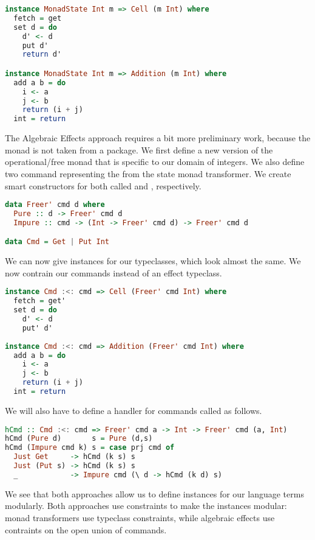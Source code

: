 \begin{lstlisting}[language=Haskell]
instance MonadState Int m => Cell (m Int) where
  fetch = get
  set d = do
    d' <- d
    put d'
    return d'

instance MonadState Int m => Addition (m Int) where
  add a b = do
    i <- a
    j <- b
    return (i + j)
  int = return
\end{lstlisting}

The Algebraic Effects approach requires a bit more preliminary work, because the monad is not taken from a package. We first define a new version of the operational/free monad that is specific to our domain of integers. We also define two command representing the  from the state monad transformer. We create smart constructors for both called  and , respectively.

\begin{lstlisting}[language=Haskell]
data Freer' cmd d where
  Pure :: d -> Freer' cmd d
  Impure :: cmd -> (Int -> Freer' cmd d) -> Freer' cmd d

data Cmd = Get | Put Int
\end{lstlisting}

We can now give instances for our typeclasses, which look almost the same. We now contrain our commands instead of an effect typeclass.

\begin{lstlisting}[language=Haskell]
instance Cmd :<: cmd => Cell (Freer' cmd Int) where
  fetch = get'
  set d = do
    d' <- d
    put' d'
    
instance Cmd :<: cmd => Addition (Freer' cmd Int) where
  add a b = do
    i <- a
    j <- b
    return (i + j)
  int = return
\end{lstlisting}

We will also have to define a handler for  commands called  as follows.

\begin{lstlisting}[language=Haskell]
hCmd :: Cmd :<: cmd => Freer' cmd a -> Int -> Freer' cmd (a, Int)
hCmd (Pure d)       s = Pure (d,s)
hCmd (Impure cmd k) s = case prj cmd of
  Just Get     -> hCmd (k s) s
  Just (Put s) -> hCmd (k s) s
  _            -> Impure cmd (\ d -> hCmd (k d) s)
\end{lstlisting}

We see that both approaches allow us to define instances for our language terms modularly. Both approaches use constraints to make the instances modular: monad transformers use typeclass constraints, while algebraic effects use contraints on the open union of commands.

